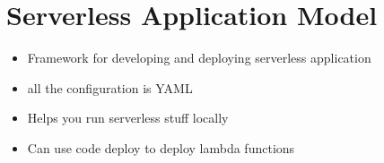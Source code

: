 \documentclass[]{scrartcl}
\begin{document}
\section{Serverless Application Model}
\begin{itemize}
	\item Framework for developing and deploying serverless application
	\item all the configuration is YAML
	\item Helps you run serverless stuff locally
	\item Can use code deploy to deploy lambda functions
\end{itemize}
\end{document}
